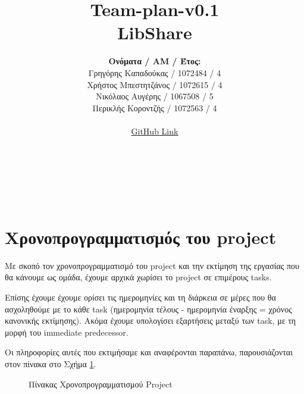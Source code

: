 \documentclass[12pt,a4paper]{article}
\title{Team-plan-v0.1 \\ LibShare}
\author{\textbf{Ονόματα / ΑΜ / Έτος:} \\ Γρηγόρης Καπαδούκας / 1072484 / 4\textdegree \\ Χρήστος Μπεστητζάνος / 1072615 / 4\textdegree \\ Νικόλαος Αυγέρης / 1067508 / 5\textdegree \\ Περικλής Κοροντζής / 1072563 / 4\textdegree\\ \\ \href{https://github.com/GregKapadoukas/University-Software-Engineering-Project}{\color{blue}GitHub Link}}
\begin{document}
\makeatletter
\begin{center}
	\LARGE{\@title} \\
	\pagebreak
\end{center}
\begin{LARGE}\@author\end{LARGE} \\
\pagebreak

\section{Χρονοπρογραμματισμός του project}
Με σκοπό τον χρονοπρογραμματισμό του project και την εκτίμηση της εργασίας που θα κάνουμε ως ομάδα, έχουμε αρχικά χωρίσει το project σε επιμέρους tasks.

Επίσης έχουμε έχουμε ορίσει τις ημερομηνίες και τη διάρκεια σε μέρες που θα ασχοληθούμε με το κάθε task (ημερομηνία τέλους - ημερομηνία έναρξης = χρόνος κανονικής εκτίμησης). Ακόμα έχουμε υπολογίσει εξαρτήσεις μεταξύ των task, με τη μορφή του immediate predecessor.

Οι πληροφορίες αυτές που εκτιμήσαμε και αναφέρονται παραπάνω, παρουσιάζονται στον πίνακα στο Σχήμα \ref{Πίνακας Χρονοπρογραμματισμού Project}.

\begin{figure}[H]
	\caption{Πίνακας Χρονοπρογραμματισμού Project}
	\label{Πίνακας Χρονοπρογραμματισμού Project}
\end{figure}
\end{document}
